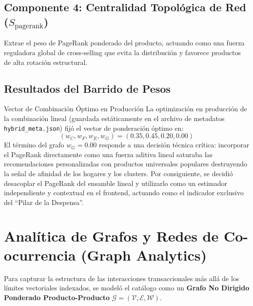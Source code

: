 \documentclass[11pt,a4paper]{article}
\begin{document}
\subsection{Componente 4: Centralidad Topológica de Red ($S_{\text{pagerank}}$)}
Extrae el peso de PageRank ponderado del producto, actuando como una fuerza reguladora global de cross-selling que evita la distribución y favorece productos de alta rotación estructural.

\subsection{Resultados del Barrido de Pesos}
\begin{techbox}{Vector de Combinación Óptimo en Producción}
La optimización en producción de la combinación lineal (guardada estáticamente en el archivo de metadatos \texttt{hybrid\_meta.json}) fijó el vector de ponderación óptimo en:
\begin{equation}
(w_C, w_F, w_E, w_G) = (0.35, 0.45, 0.20, 0.00)
\end{equation}
El término del grafo $w_G = 0.00$ responde a una decisión técnica crítica: incorporar el PageRank directamente como una fuerza aditiva lineal saturaba las recomendaciones personalizadas con productos universales populares destruyendo la señal de afinidad de los hogares y los clusters. Por consiguiente, se decidió desacoplar el PageRank del ensamble lineal y utilizarlo como un estimador independiente y contextual en el frontend, actuando como el indicador exclusivo del ``Pilar de la Despensa''.
\end{techbox}

\section{Analítica de Grafos y Redes de Co-ocurrencia (Graph Analytics)}
Para capturar la estructura de las interacciones transaccionales más allá de los límites vectoriales indexados, se modeló el catálogo como un \textbf{Grafo No Dirigido Ponderado Producto-Producto} $\mathcal{G} = (\mathcal{V}, \mathcal{E}, \mathcal{W})$.
\end{document}
